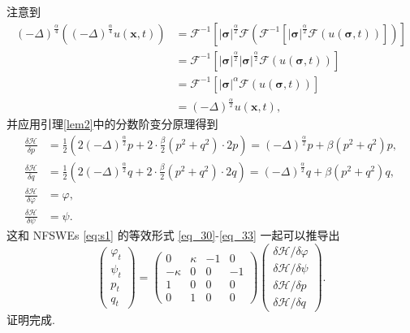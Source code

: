 \begin{pf}
注意到
\begin{align}\label{eq_12071}
(-\Delta)^{\frac{\alpha}{4}}((-\Delta)^{\frac{\alpha}{4}}  u(\boldsymbol{x},t))&=\mathcal{F}^{-1}\left[|\boldsymbol{\sigma}|^{\frac{\alpha}{2}} \mathcal{F}(\mathcal{F}^{-1}\left[|\boldsymbol{\sigma}|^{\frac{\alpha}{2}} \mathcal{F}(u(\boldsymbol{\sigma},t))\right])\right]\nonumber\\
&=\mathcal{F}^{-1}\left[|\boldsymbol{\sigma}|^{\frac{\alpha}{2}} |\boldsymbol{\sigma}|^{\frac{\alpha}{2}} \mathcal{F}(u(\boldsymbol{\sigma},t))\right]\nonumber\\
&=\mathcal{F}^{-1}\left[|\boldsymbol{\sigma}|^{\alpha} \mathcal{F}(u(\boldsymbol{\sigma},t))\right]\nonumber\\
&=(-\Delta)^{\frac{\alpha}{2}} u(\boldsymbol{x},t),
\end{align}
并应用引理\ref{lem2}中的分数阶变分原理得到
\begin{align}
\frac{\delta \mathcal{H}}{\delta p} &=\frac{1}{2}\left(2(-\Delta)^{\frac{\alpha}{2}} p+2 \cdot \frac{\beta}{2}\left(p^{2}+q^{2}\right) \cdot 2 p\right)=(-\Delta)^{\frac{\alpha}{2}}p+\beta\left(p^{2}+q^{2}\right) p,\label{eq_38a}\\
\frac{\delta \mathcal{H}}{\delta q} &=\frac{1}{2}\left(2(-\Delta)^{\frac{\alpha}{2}} q+2 \cdot \frac{\beta}{2}\left(p^{2}+q^{2}\right) \cdot 2 q\right)=(-\Delta)^{\frac{\alpha}{2}}q+\beta\left(p^{2}+q^{2}\right) q,\label{eq_38b}\\
\frac{\delta \mathcal{H}}{\delta \varphi} &=\varphi,\label{eq_38c}\\
\frac{\delta \mathcal{H}}{\delta \psi} &=\psi.\label{eq_38}
\end{align}
这和 NFSWEs \eqref{eq:s1} 的等效形式 \eqref{eq_30}-\eqref{eq_33} 一起可以推导出
\begin{equation}\label{eq_39}
\left(\begin{array}{l}
		\varphi_{t} \\
		\psi_{t} \\
		p_{t} \\
		q_{t}
\end{array}\right)
=\left(\begin{array}{cccc}
			0 & \kappa & -1 & 0 \\
			-\kappa & 0 & 0 & -1 \\
			1 & 0 & 0 & 0 \\
			0 & 1 & 0 & 0
\end{array}\right)
\left(\begin{array}{l}
		\delta \mathcal{H} / \delta \varphi \\
		\delta \mathcal{H} / \delta \psi \\
		\delta \mathcal{H} / \delta p \\
		\delta \mathcal{H} / \delta q
\end{array}\right).
\end{equation}
证明完成.
\end{pf}

